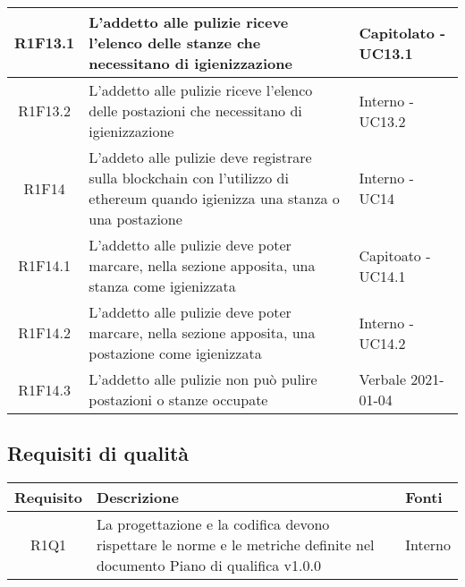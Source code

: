 \begin{center}
\begin{longtable}{|c|p{10cm}|p{4cm}|}
						\hline
			R1F13.1&	L'addetto alle pulizie riceve l'elenco delle stanze che necessitano di igienizzazione& 	Capitolato - UC13.1\\
					\hline
			R1F13.2&L'addetto alle pulizie riceve l'elenco delle postazioni che necessitano di igienizzazione	& Interno - UC13.2	\\
					\hline
R1F14&L'addeto alle pulizie deve registrare sulla blockchain con l'utilizzo di ethereum quando igienizza una stanza o una postazione	& Interno - UC14	\\
					\hline
R1F14.1&L'addetto alle pulizie deve poter marcare, nella sezione apposita, una stanza come igienizzata	& Capitoato - UC14.1	\\
						\hline
			R1F14.2&L'addetto alle pulizie deve poter marcare, nella sezione apposita, una postazione come igienizzata	&Interno - UC14.2 	\\
					\hline
			R1F14.3&L'addetto alle pulizie non può pulire postazioni o stanze occupate	& Verbale 2021-01-04	\\
					\hline
						
	\end{longtable}
\end{center}
\subsection{Requisiti di qualità}
\begin{center}
	\begin{longtable}{|c|p{10cm}|p{4cm}|}
		\hline
		\rowcolor{lighter-grayer}
		\textbf{Requisito} & \textbf{Descrizione} & \textbf{Fonti}  \\
		\hline
		\endfirsthead
		
		 R1Q1 &La progettazione e la codifica devono rispettare le norme e le metriche definite nel documento Piano di qualifica v1.0.0 & Interno\\
		\hline
		
	\end{longtable}
\end{center}

